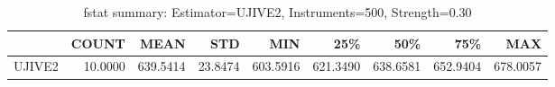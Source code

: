 \begin{table}[ht]
\centering
\caption{fstat summary: Estimator=UJIVE2, Instruments=500, Strength=0.30}
\begin{tabular}{lrrrrrrrr}
\toprule
 & COUNT & MEAN & STD & MIN & 25\% & 50\% & 75\% & MAX \\
\midrule
UJIVE2 & 10.0000 & 639.5414 & 23.8474 & 603.5916 & 621.3490 & 638.6581 & 652.9404 & 678.0057 \\
\bottomrule
\end{tabular}
\end{table}
